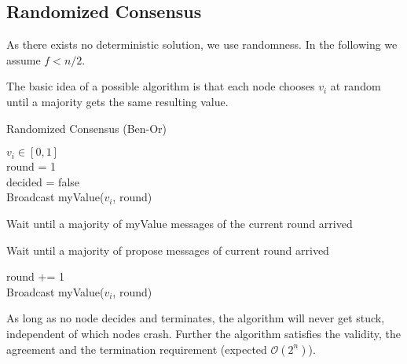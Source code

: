 \subsection{Randomized Consensus}

As there exists no deterministic solution, we use randomness. In the following we assume $f < n/2$. \medskip

The basic idea of a possible algorithm is that each node chooses $v_i$ at random until a majority gets the same resulting value.\medskip

\begin{algorithm}[H]
\caption{Randomized Consensus (Ben-Or)}
	$v_i \in [0, 1]$ 		\\
	round = 1 \\
	decided = false \\
	
	\BlankLine
	Broadcast myValue($v_i$, round) \\
	\BlankLine
	
	 {
		\BlankLine
		\BlankLine
		
		Wait until a majority of myValue messages of the current round arrived \\
		
		\BlankLine
		
		\BlankLine
		\BlankLine
		
		Wait until a majority of propose messages of current round arrived \\
		
		round += 1 \\
		Broadcast myValue($v_i$, round)
	}
\end{algorithm}
\medskip

As long as no node decides and terminates, the algorithm will never get stuck, independent of which nodes crash. Further the algorithm satisfies the validity, the agreement and the termination requirement (expected $\mathcal{O}(2^n)$). \medskip

